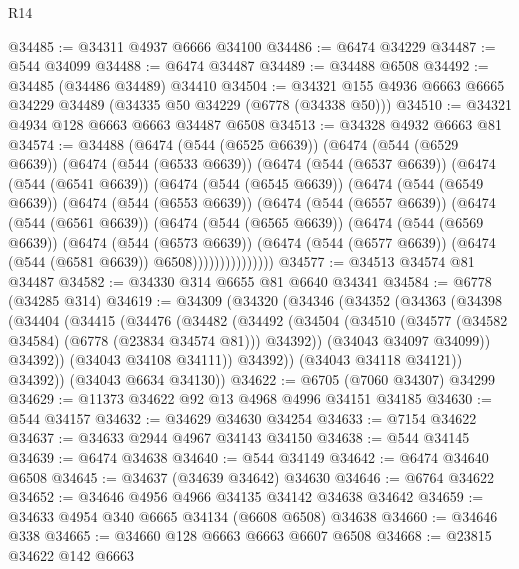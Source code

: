 \begin{lexlean}{R14}
\begin{coremodule}
@34485 := @34311 @4937 @6666 @34100
@34486 := @6474 @34229
@34487 := @544 @34099
@34488 := @6474 @34487
@34489 := @34488 @6508
@34492 := @34485 (@34486 @34489) @34410
@34504 := @34321 @155 @4936 @6663 @6665 @34229 @34489 (@34335 @50 @34229 (@6778 (@34338 @50)))
@34510 := @34321 @4934 @128 @6663 @6663 @34487 @6508
@34513 := @34328 @4932 @6663 @81
@34574 := @34488
    (@6474
      (@544 (@6525 @6639))
      (@6474
        (@544 (@6529 @6639))
        (@6474
          (@544 (@6533 @6639))
          (@6474
            (@544 (@6537 @6639))
            (@6474
              (@544 (@6541 @6639))
              (@6474
                (@544 (@6545 @6639))
                (@6474
                  (@544 (@6549 @6639))
                  (@6474
                    (@544 (@6553 @6639))
                    (@6474
                      (@544 (@6557 @6639))
                      (@6474
                        (@544 (@6561 @6639))
                        (@6474
                          (@544 (@6565 @6639))
                          (@6474
                            (@544 (@6569 @6639))
                            (@6474
                              (@544 (@6573 @6639))
                              (@6474
                                (@544 (@6577 @6639))
                                (@6474 (@544 (@6581 @6639)) @6508)))))))))))))))
@34577 := @34513 @34574 @81 @34487
@34582 := @34330 @314 @6655 @81 @6640 @34341
@34584 := @6778 (@34285 @314)
@34619 := @34309
    (@34320
      (@34346
        (@34352
          (@34363
            (@34398
              (@34404
                (@34415
                  (@34476
                    (@34482
                      (@34492
                        (@34504
                          (@34510 (@34577 (@34582 @34584) (@6778 (@23834 @34574 @81))) @34392))
                        (@34043 @34097 @34099))
                      @34392))
                  (@34043 @34108 @34111))
                @34392))
            (@34043 @34118 @34121))
          @34392))
      (@34043 @6634 @34130))
@34622 := @6705 (@7060 @34307) @34299
@34629 := @11373 @34622 @92 @13 @4968 @4996 @34151 @34185
@34630 := @544 @34157
@34632 := @34629 @34630 @34254
@34633 := @7154 @34622
@34637 := @34633 @2944 @4967 @34143 @34150
@34638 := @544 @34145
@34639 := @6474 @34638
@34640 := @544 @34149
@34642 := @6474 @34640 @6508
@34645 := @34637 (@34639 @34642) @34630
@34646 := @6764 @34622
@34652 := @34646 @4956 @4966 @34135 @34142 @34638 @34642
@34659 := @34633 @4954 @340 @6665 @34134 (@6608 @6508) @34638
@34660 := @34646 @338
@34665 := @34660 @128 @6663 @6663 @6607 @6508
@34668 := @23815 @34622 @142 @6663

\end{coremodule}
\end{lexlean}
